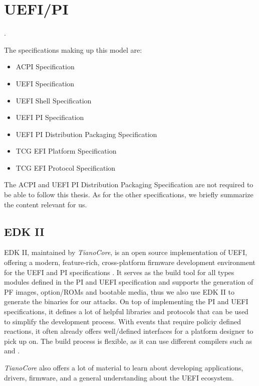 
\chapter{\acs{UEFI}/\acs{PI}}
\label{sec:uefi-pi}

.

The specifications making up this model are:

\begin{itemize}
    \item \acs{ACPI} Specification
    \item \acs{UEFI} Specification
    \item \acs{UEFI} Shell Specification
    \item \acs{UEFI} \acs{PI} Specification
    \item \acs{UEFI} \acs{PI} Distribution Packaging Specification
    \item \acs{TCG} \acs{EFI} Platform Specification
    \item \acs{TCG} \acs{EFI} Protocol Specification
\end{itemize}

The \ac{ACPI} and \ac{UEFI} \ac{PI} Distribution Packaging Specification are not required to be able to follow this thesis.
As for the other specifications, we briefly summarize the content relevant for us.


\clearpage


\clearpage


\clearpage


\section{\acs{EDK} II}

\ac{EDK} II, maintained by \emph{TianoCore}, is an open source implementation of \ac{UEFI}, offering a modern, feature-rich, cross-platform firmware development environment for the \ac{UEFI} and \ac{PI} specifications \cite{tianocore}.
It serves as the build tool for all types modules defined in the \ac{PI} and \ac{UEFI} specification and supports the generation of \ac{PF} images, option\-/\acp{ROM} and bootable media, thus we also use \ac{EDK} II to generate the binaries for our attacks.
On top of implementing the \ac{PI} and \ac{UEFI} specifications, it defines a lot of helpful libraries and protocols that can be used to simplify the development process.
With events that require policiy defined reactions, it often already offers well\-/defined interfaces for a platform designer to pick up on.
The build process is flexible, as it can use different compilers such as  and .

\emph{TianoCore} also offers a lot of material to learn about developing applications, drivers, firmware, and a general understanding about the \ac{UEFI} ecosystem.